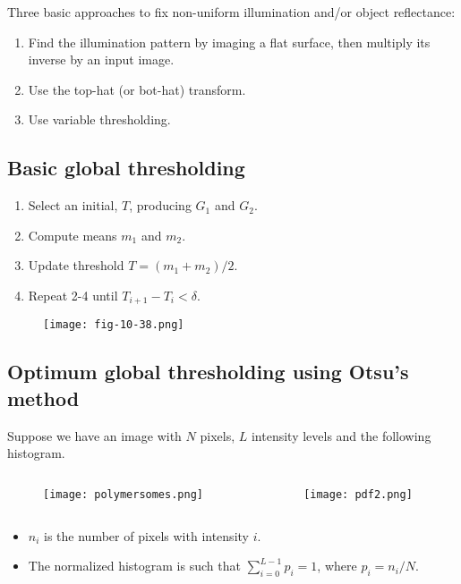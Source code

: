 \begin{frame}
Three basic approaches to fix non-uniform illumination and/or object reflectance:
\begin{enumerate}
\item Find the illumination pattern by imaging a flat surface, then multiply its inverse by an input image.
\item Use the top-hat (or bot-hat) transform.
\item Use variable thresholding.
\end{enumerate}
\end{frame}

\subsection{Basic global thresholding}

\begin{frame}
\begin{enumerate}
\item Select an initial, $T$, producing $G_{1}$ and $G_{2}$.
\item Compute means $m_{1}$ and $m_{2}$.
\item Update threshold $T = \left (m_{1} + m_{2} \right )/2$.
\item Repeat 2-4 until $T_{i+1}-T_{i} < \delta$.
\end{enumerate}
\begin{figure}[!h]
\texttt{[image: fig-10-38.png]}
\end{figure}
\end{frame}

\subsection{Optimum global thresholding using Otsu's method}

\begin{frame}
Suppose we have an image with $N$ pixels, $L$ intensity levels and the following histogram.
\begin{columns}
\begin{column}{.35\textwidth}
\begin{figure}[!h]
\texttt{[image: polymersomes.png]}
\end{figure}
\end{column}
\begin{column}{.65\textwidth}
\begin{figure}[!h]
\texttt{[image: pdf2.png]}
\end{figure}
\end{column}
\end{columns}
\begin{itemize}
\item $n_{i}$ is the number of pixels with intensity $i$.
\item The normalized histogram is such that $\sum_{i=0}^{L-1}p_{i} = 1$, where $p_{i} = n_{i}/N$.
\end{itemize}
\end{frame}

